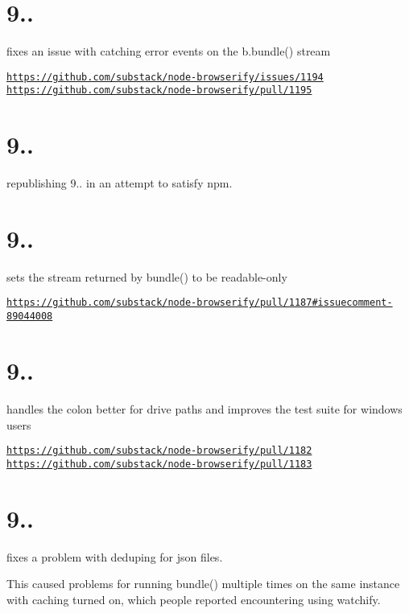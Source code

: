 \section*{9..}

fixes an issue with catching error events on the b.\+bundle() stream

\href{https://github.com/substack/node-browserify/issues/1194}{\tt https\+://github.\+com/substack/node-\/browserify/issues/1194} \href{https://github.com/substack/node-browserify/pull/1195}{\tt https\+://github.\+com/substack/node-\/browserify/pull/1195}

\section*{9..}

republishing 9.. in an attempt to satisfy npm.

\section*{9..}

sets the stream returned by bundle() to be readable-\/only

\href{https://github.com/substack/node-browserify/pull/1187#issuecomment-89044008}{\tt https\+://github.\+com/substack/node-\/browserify/pull/1187\#issuecomment-\/89044008}

\section*{9..}

handles the colon better for drive paths and improves the test suite for windows users

\href{https://github.com/substack/node-browserify/pull/1182}{\tt https\+://github.\+com/substack/node-\/browserify/pull/1182} \href{https://github.com/substack/node-browserify/pull/1183}{\tt https\+://github.\+com/substack/node-\/browserify/pull/1183}

\section*{9..}

fixes a problem with deduping for json files.

This caused problems for running bundle() multiple times on the same instance with caching turned on, which people reported encountering using watchify.


